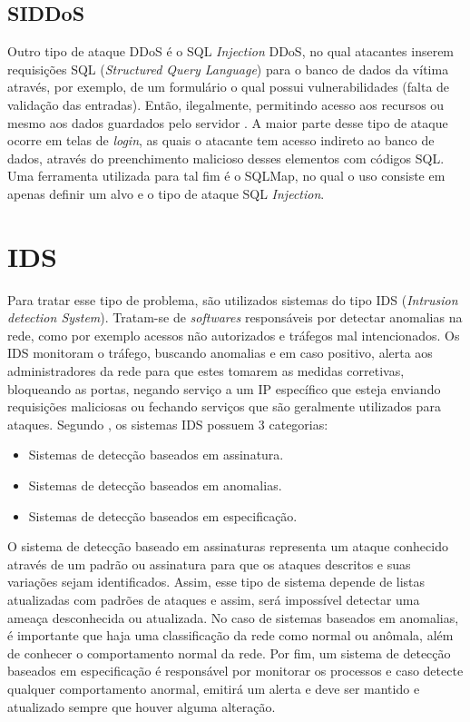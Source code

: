  
 \subsection{SIDDoS}   
  Outro tipo de ataque DDoS é o SQL \textit{Injection} DDoS, no qual atacantes inserem  requisições SQL (\textit{Structured Query Language}) para o banco de dados da vítima através, por exemplo, de um formulário o qual possui vulnerabilidades (falta de validação das entradas). Então, ilegalmente, permitindo acesso aos recursos ou mesmo aos dados guardados pelo servidor \cite{DataMining}. A maior parte desse tipo de ataque ocorre em telas de \textit{login}, as quais o atacante tem acesso indireto ao banco de dados, através do preenchimento malicioso desses elementos com códigos SQL. Uma ferramenta utilizada para tal fim é o SQLMap, no qual o uso consiste em apenas definir um alvo e o tipo de ataque SQL \textit{Injection}. 

\section{IDS}

Para tratar esse tipo de problema, são utilizados sistemas do tipo IDS (\textit{Intrusion detection System}). Tratam-se de \textit{softwares} responsáveis  por detectar anomalias na rede, como por exemplo acessos não autorizados e tráfegos mal intencionados. Os IDS monitoram o tráfego, buscando anomalias e em caso positivo, alerta aos administradores da rede para que estes tomarem as medidas corretivas, bloqueando as portas, negando serviço a um IP específico que esteja enviando requisições maliciosas ou fechando serviços que são geralmente utilizados para ataques. Segundo , os sistemas IDS possuem 3 categorias: 
\begin{itemize}
	\item Sistemas de detecção baseados em assinatura.
	\item Sistemas de detecção baseados em anomalias.
	\item Sistemas de detecção baseados em especificação.
\end{itemize}

O sistema de detecção baseado em assinaturas representa um ataque conhecido através de um padrão ou assinatura para que os ataques descritos e suas variações sejam identificados. Assim, esse tipo de sistema depende de listas atualizadas com padrões de ataques e assim, será impossível detectar uma ameaça desconhecida ou atualizada. No caso de sistemas baseados em anomalias, é importante que haja uma classificação da rede como normal ou anômala, além de conhecer o comportamento normal da rede. Por fim, um sistema de detecção baseados em especificação é responsável por monitorar os processos e caso detecte qualquer comportamento anormal, emitirá um alerta e deve ser mantido e atualizado sempre que houver alguma alteração.

